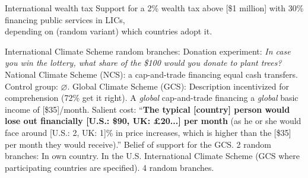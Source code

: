 \documentclass[aspectratio=169,xcolor=dvipsnames, 11pt,mathserif]{beamer}
\begin{document}
\begin{frame}{International wealth tax}
\centering Support for a 2\% wealth tax above [\$1 million] with 30\% financing public services in LICs,\\depending on (random variant) which countries adopt it.
\end{frame}

\begin{frame}{International Climate Scheme} %
    \bbvsp {} random branches:
      \bbvsp \ip Donation experiment: \textit{In case you win the lottery, what share of the \$100 would you donate to plant trees?}
      \ip National Climate Scheme (NCS): a cap-and-trade financing equal cash transfers.
      \ip Control group: $\varnothing$. \ee
    \ip Global Climate Scheme (GCS): %
      \bbvsp \ip Description incentivized for comprehension (72\% get it right).
      \ip A \textit{global} cap-and-trade financing a \textit{global} basic income of [\$35]/month.
      \ip Salient cost: ``\textbf{The typical [country] person would lose out financially [U.S.: \$90, UK: £20...] per month} (as he or she would face around [U.S.: 2, UK: 1]\% in price increases, which is higher than the [\$35] per month they would receive).'' \ee
    \ip Belief of support for the GCS. 2 random branches:
      \bbvs \ip In own country.
      \ip In the U.S. \ee
    \ip International Climate Scheme (GCS where participating countries are specified). 4 random branches. 
    \ee
\end{frame}
\end{document}
